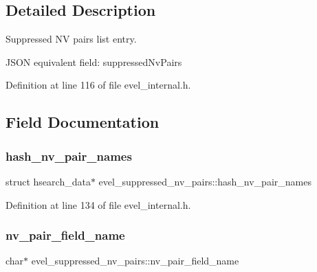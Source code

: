 \subsection{Detailed Description}
Suppressed NV pairs list entry. 

J\+S\+ON equivalent field\+: suppressed\+Nv\+Pairs 

Definition at line 116 of file evel\+\_\+internal.\+h.



\subsection{Field Documentation}
\hypertarget{structevel__suppressed__nv__pairs_ad62100efab258703433968a2effb1221}{}\label{structevel__suppressed__nv__pairs_ad62100efab258703433968a2effb1221} 
\subsubsection{\texorpdfstring{hash\+\_\+nv\+\_\+pair\+\_\+names}{hash\_nv\_pair\_names}}
{\footnotesize\ttfamily struct hsearch\+\_\+data$\ast$ evel\+\_\+suppressed\+\_\+nv\+\_\+pairs\+::hash\+\_\+nv\+\_\+pair\+\_\+names}



Definition at line 134 of file evel\+\_\+internal.\+h.

\hypertarget{structevel__suppressed__nv__pairs_a573e5fe33375ecce2b876375d0522b60}{}\label{structevel__suppressed__nv__pairs_a573e5fe33375ecce2b876375d0522b60} 
\subsubsection{\texorpdfstring{nv\+\_\+pair\+\_\+field\+\_\+name}{nv\_pair\_field\_name}}
{\footnotesize\ttfamily char$\ast$ evel\+\_\+suppressed\+\_\+nv\+\_\+pairs\+::nv\+\_\+pair\+\_\+field\+\_\+name}



